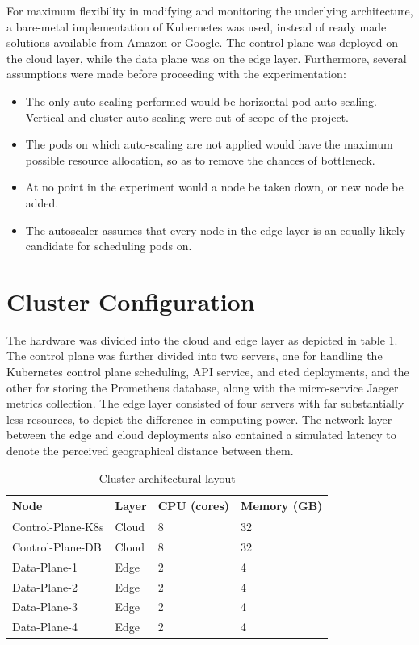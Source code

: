 For maximum flexibility in modifying and monitoring the underlying architecture, a bare-metal implementation of Kubernetes was used, instead of ready made solutions available from Amazon or Google. The control plane was deployed on the cloud layer, while the data plane was on the edge layer. Furthermore, several assumptions were made before proceeding with the experimentation:

\begin{itemize}
    \item The only auto-scaling performed would be horizontal pod auto-scaling. Vertical and cluster auto-scaling were out of scope of the project.
    \item The pods on which auto-scaling are not applied would have the maximum possible resource allocation, so as to remove the chances of bottleneck.
    \item At no point in the experiment would a node be taken down, or new node be added.
    \item The autoscaler assumes that every node in the edge layer is an equally likely candidate for scheduling pods on.
\end{itemize}

\section{Cluster Configuration}
\label{sec:ch5-cluster-config}

The hardware was divided into the cloud and edge layer as depicted in table \ref{tab:cluster-hw-overview}. The control plane was further divided into two servers, one for handling the Kubernetes control plane scheduling, API service, and etcd deployments, and the other for storing the Prometheus database, along with the micro-service Jaeger metrics collection. The edge layer consisted of four servers with far substantially less resources, to depict the difference in computing power. The network layer between the edge and cloud deployments also contained a simulated latency to denote the perceived geographical distance between them.\par

\begin{table}
    \caption{Cluster architectural layout}\label{tab:cluster-hw-overview}
    \centering
    \begin{tabular}{|l|l|l|l|}
        \hline
        Node & Layer & CPU (cores) & Memory (GB)\\
        \hline
        Control-Plane-K8s & Cloud & 8 & 32\\
        Control-Plane-DB  & Cloud & 8 & 32\\
        Data-Plane-1      & Edge  & 2 & 4\\
        Data-Plane-2      & Edge  & 2 & 4\\
        Data-Plane-3      & Edge  & 2 & 4\\
        Data-Plane-4      & Edge  & 2 & 4\\
        \hline
    \end{tabular}
\end{table}

